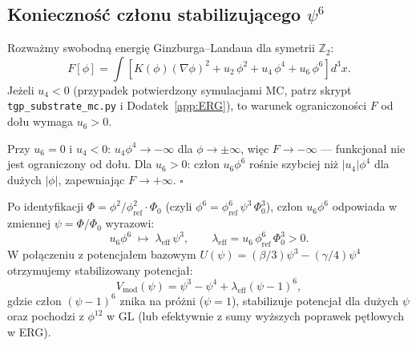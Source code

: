\subsection{Konieczność członu stabilizującego \texorpdfstring{$\psi^6$}{ψ⁶}}
\label{subsec:psi6_necessity}

\begin{twierdzenie}
\label{thm:psi6_necessity}
Rozważmy swobodną energię Ginzburga–Landaua dla symetrii $\mathbb{Z}_2$:
\begin{equation}
  F[\phi] = \int\!\left[
    K(\phi)(\nabla\phi)^2
    + u_2\,\phi^2 + u_4\,\phi^4 + u_6\,\phi^6
  \right]d^3x.
  \label{eq:GL_free_energy}
\end{equation}
Jeżeli $u_4 < 0$ (przypadek potwierdzony symulacjami MC, patrz
skrypt \texttt{tgp\_substrate\_mc.py} i Dodatek~\ref{app:ERG}), to
warunek ograniczoności $F$ od dołu wymaga $u_6 > 0$.
\end{twierdzenie}

\begin{dowod}
Przy $u_6 = 0$ i $u_4 < 0$: $u_4\phi^4 \to -\infty$ dla $\phi \to \pm\infty$,
więc $F \to -\infty$ — funkcjonał nie jest ograniczony od dołu.
Dla $u_6 > 0$: człon $u_6\phi^6$ rośnie szybciej niż $|u_4|\phi^4$
dla dużych $|\phi|$, zapewniając $F \to +\infty$. \hfill$\square$
\end{dowod}

\begin{wniosek}
\label{cor:psi3_tgp}
Po identyfikacji $\Phi = \phi^2/\phi_\mathrm{ref}^2 \cdot \Phi_0$
(czyli $\phi^6 = \phi_\mathrm{ref}^6\,\psi^3\,\Phi_0^3$), człon $u_6\phi^6$
odpowiada w zmiennej $\psi = \Phi/\Phi_0$ wyrazowi:
\begin{equation}
  u_6\phi^6 \;\mapsto\; \lambda_\mathrm{eff}\,\psi^3,
  \qquad \lambda_\mathrm{eff} = u_6\,\phi_\mathrm{ref}^6\,\Phi_0^3 > 0.
\end{equation}
W połączeniu z potencjałem bazowym $U(\psi) = (\beta/3)\psi^3 - (\gamma/4)\psi^4$
otrzymujemy stabilizowany potencjał:
\begin{equation}
  \boxed{V_\mathrm{mod}(\psi) = \psi^3 - \psi^4 + \lambda_\mathrm{eff}(\psi - 1)^6,}
  \label{eq:Vmod}
\end{equation}
gdzie człon $(\psi-1)^6$ znika na próżni ($\psi=1$), stabilizuje
potencjał dla dużych $\psi$ oraz pochodzi z $\phi^{12}$ w GL
(lub efektywnie z sumy wyższych poprawek pętlowych w ERG).
\end{wniosek}

